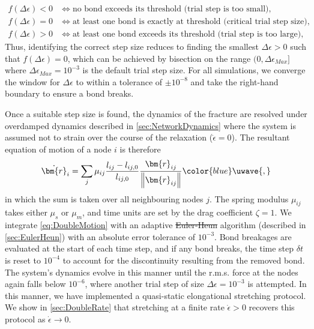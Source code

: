\documentclass[asymmetricmargins]{library/duthesis}%
\providecommand{\DIFadd}[1]{{\protect\color{blue}\uwave{#1}}} %
\providecommand{\DIFdel}[1]{{\protect\color{red}\sout{#1}}}                      %
\providecommand{\DIFaddbegin}{} %
\providecommand{\DIFaddend}{} %
\providecommand{\DIFdelbegin}{} %
\providecommand{\DIFdelend}{} %
\begin{document}
\begin{align*}
    f(\Delta\epsilon) < 0 &\iff \text{no bond exceeds its threshold (trial step is too small)}, \\
    f(\Delta\epsilon) = 0 &\iff \text{at least one bond is exactly at threshold (critical trial step size)}, \\
    f(\Delta\epsilon) > 0 &\iff \text{at least one bond exceeds its threshold (trial step is too large)},
\end{align*}
Thus, identifying the correct step size reduces to finding the smallest $\Delta\epsilon >0$ such that $f(\Delta\epsilon) = 0$, which can be achieved by bisection on the range $(0,\Delta\epsilon_{Max}]$ where $\Delta\epsilon_{Max}=10^{-3}$ is the default trial step size. For all simulations, we converge the window for $\Delta\epsilon$ to within a tolerance of $\pm 10^{-8}$ and take the right-hand boundary to ensure a bond breaks.  

Once a suitable step size is found, the dynamics of the fracture are resolved under overdamped dynamics described in \cref{sec:NetworkDynamics} where the system is assumed not to strain over the course of the relaxation ($\dot{\epsilon}=0$). The resultant equation of motion of a node $i$ is therefore 
\begin{equation}
    \dot{\bm{r}}_i = \sum_{j}\mu_{ij} \frac{l_{ij}-l_{ij,0}}{l_{ij,0}}\frac{\bm{r}_{ij}}{\left\lVert \bm{r}_{ij} \right\rVert}\DIFaddbegin \DIFadd{,
    }\DIFaddend \label{eq:DoubleMotion}
\end{equation}
in which the sum is taken over all neighbouring nodes $j$. The spring modulus $\mu_{ij}$ takes either $\mu_s$ or $\mu_m$, and time units are set by the drag coefficient $\zeta=1$. We integrate \cref{eq:DoubleMotion} with an adaptive \DIFdelbegin \DIFdel{Euler-Heun }\DIFdelend \DIFaddbegin \DIFadd{Euler--Heun }\DIFaddend algorithm (described in \cref{sec:EulerHeun}) with an absolute error tolerance of $10^{-3}$. Bond breakages are evaluated at the start of each time step, and if any bond breaks, the time step $\delta t$ is reset to $10^{-4}$ to account for the discontinuity resulting from the removed bond. The system's dynamics evolve in this manner until the r.m.s. force at the nodes again falls below $10^{-6}$, where another trial step of size $\Delta\epsilon=10^{-3}$ is attempted. In this manner, we have implemented a quasi-static elongational stretching protocol. We show in \cref{sec:DoubleRate} that stretching at a finite rate $\dot{\epsilon} > 0$ recovers this protocol as $\dot{\epsilon} \to 0$.
\end{document}

